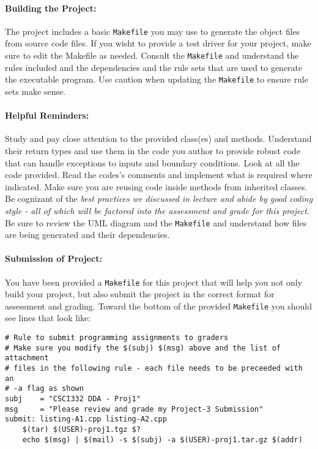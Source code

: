\documentclass[10pt,letterpaper]{article}
\newcounter{x}\setcounter{x}{1}
\begin{document}
\paragraph{Building the Project:} The project includes a  basic \verb|Makefile| you may use to generate the object  files from source code files. If you wisht to provide a test driver for your project, make sure to edit the Makefile as needed. Consult the \verb|Makefile| and understand the rules included and the dependencies and the rule sets that are used to generate the executable program. Use caution when updating the \verb|Makefile| to ensure rule sets make sense. 

\paragraph{Helpful Reminders:} Study and pay close attention to the provided class(es) and methods. Understand their return types and use them in the code you author to provide robust code that can handle exceptions to inputs and boundary conditions. Look at all the code provided. Read the codes's comments and implement what is required where indicated. Make sure you are reusing code inside methods from inherited classes. Be cognizant of the {\em{}best practices we discussed in lecture and abide by good coding style - all of which will be factored into the assessment and grade for this project}. Be sure to review the UML diagram and the \verb|Makefile| and understand how files are being generated and their dependencies. 

\paragraph{Submission of Project:} You have been provided a \verb|Makefile| for this project that will help you not only build your project, but also submit the project in the correct format for assessment and grading. Toward the bottom of the provided \verb|Makefile| you should see lines that look like:

\begin{lstlisting}
# Rule to submit programming assignments to graders
# Make sure you modify the $(subj) $(msg) above and the list of attachment
# files in the following rule - each file needs to be preceeded with an
# -a flag as shown
subj    = "CSCI332 DDA - Proj1"
msg     = "Please review and grade my Project-3 Submission"
submit:	listing-A1.cpp listing-A2.cpp
	$(tar) $(USER)-proj1.tgz $?
	echo $(msg) | $(mail) -s $(subj) -a $(USER)-proj1.tar.gz $(addr)
\end{lstlisting}
\end{document}
